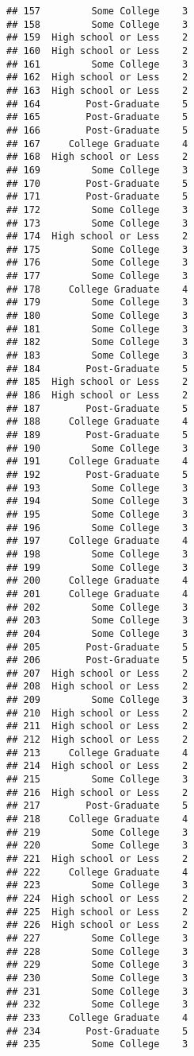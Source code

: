 \documentclass[
]{article}
\begin{document}
\begin{verbatim}
## 157         Some College    3
## 158         Some College    3
## 159  High school or Less    2
## 160  High school or Less    2
## 161         Some College    3
## 162  High school or Less    2
## 163  High school or Less    2
## 164        Post-Graduate    5
## 165        Post-Graduate    5
## 166        Post-Graduate    5
## 167     College Graduate    4
## 168  High school or Less    2
## 169         Some College    3
## 170        Post-Graduate    5
## 171        Post-Graduate    5
## 172         Some College    3
## 173         Some College    3
## 174  High school or Less    2
## 175         Some College    3
## 176         Some College    3
## 177         Some College    3
## 178     College Graduate    4
## 179         Some College    3
## 180         Some College    3
## 181         Some College    3
## 182         Some College    3
## 183         Some College    3
## 184        Post-Graduate    5
## 185  High school or Less    2
## 186  High school or Less    2
## 187        Post-Graduate    5
## 188     College Graduate    4
## 189        Post-Graduate    5
## 190         Some College    3
## 191     College Graduate    4
## 192        Post-Graduate    5
## 193         Some College    3
## 194         Some College    3
## 195         Some College    3
## 196         Some College    3
## 197     College Graduate    4
## 198         Some College    3
## 199         Some College    3
## 200     College Graduate    4
## 201     College Graduate    4
## 202         Some College    3
## 203         Some College    3
## 204         Some College    3
## 205        Post-Graduate    5
## 206        Post-Graduate    5
## 207  High school or Less    2
## 208  High school or Less    2
## 209         Some College    3
## 210  High school or Less    2
## 211  High school or Less    2
## 212  High school or Less    2
## 213     College Graduate    4
## 214  High school or Less    2
## 215         Some College    3
## 216  High school or Less    2
## 217        Post-Graduate    5
## 218     College Graduate    4
## 219         Some College    3
## 220         Some College    3
## 221  High school or Less    2
## 222     College Graduate    4
## 223         Some College    3
## 224  High school or Less    2
## 225  High school or Less    2
## 226  High school or Less    2
## 227         Some College    3
## 228         Some College    3
## 229         Some College    3
## 230         Some College    3
## 231         Some College    3
## 232         Some College    3
## 233     College Graduate    4
## 234        Post-Graduate    5
## 235         Some College    3

\end{verbatim}
\end{document}

